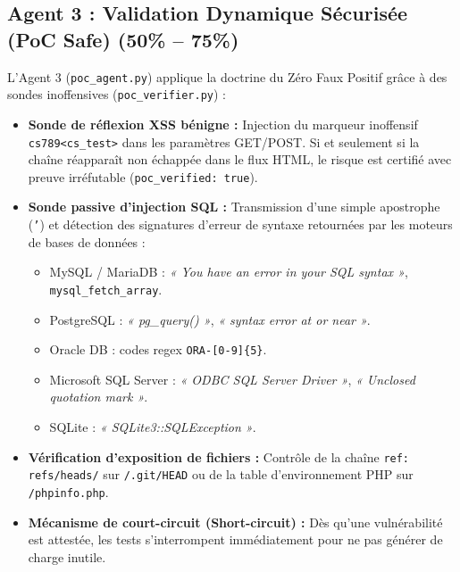 \documentclass[11pt,a4paper,oneside]{article}
\begin{document}
\subsection{Agent 3 : Validation Dynamique Sécurisée (PoC Safe) (50\% -- 75\%)}
L'Agent 3 (\texttt{poc\_agent.py}) applique la doctrine du Zéro Faux Positif grâce à des sondes inoffensives (\texttt{poc\_verifier.py}) :
\begin{itemize}
    \item \textbf{Sonde de réflexion XSS bénigne :} Injection du marqueur inoffensif \texttt{cs789<cs\_test>} dans les paramètres GET/POST. Si et seulement si la chaîne réapparaît non échappée dans le flux HTML, le risque est certifié avec preuve irréfutable (\texttt{poc\_verified: true}).
    \item \textbf{Sonde passive d'injection SQL :} Transmission d'une simple apostrophe (\texttt{'}) et détection des signatures d'erreur de syntaxe retournées par les moteurs de bases de données :
    \begin{itemize}
        \item MySQL / MariaDB : \textit{« You have an error in your SQL syntax »}, \texttt{mysql\_fetch\_array}.
        \item PostgreSQL : \textit{« pg\_query() »}, \textit{« syntax error at or near »}.
        \item Oracle DB : codes regex \texttt{ORA-[0-9]\{5\}}.
        \item Microsoft SQL Server : \textit{« ODBC SQL Server Driver »}, \textit{« Unclosed quotation mark »}.
        \item SQLite : \textit{« SQLite3::SQLException »}.
    \end{itemize}
    \item \textbf{Vérification d'exposition de fichiers :} Contrôle de la chaîne \texttt{ref: refs/heads/} sur \texttt{/.git/HEAD} ou de la table d'environnement PHP sur \texttt{/phpinfo.php}.
    \item \textbf{Mécanisme de court-circuit (Short-circuit) :} Dès qu'une vulnérabilité est attestée, les tests s'interrompent immédiatement pour ne pas générer de charge inutile.
\end{itemize}
\end{document}
